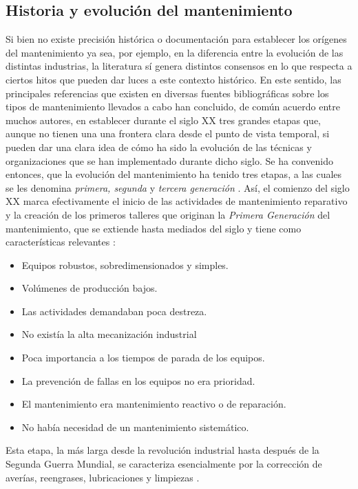 \subsection{Historia y evolución del mantenimiento}

Si bien no existe precisión histórica o documentación para establecer los orígenes del mantenimiento ya sea, por ejemplo, en la diferencia entre la evolución de las distintas industrias, la literatura sí genera distintos consensos en lo que respecta a ciertos hitos que pueden dar luces a este contexto histórico. En este sentido, las principales referencias que existen en diversas fuentes bibliográficas sobre los tipos de mantenimiento llevados a cabo han concluido, de común acuerdo entre muchos autores, en establecer durante el siglo XX tres grandes etapas que, aunque no tienen una una frontera clara desde el punto de vista temporal, si pueden dar una clara idea de cómo ha sido la evolución de las técnicas y organizaciones que se han implementado durante dicho siglo. Se ha convenido entonces, que la evolución del mantenimiento ha tenido tres etapas, a las cuales se les denomina \textit{primera, segunda} y \textit{tercera generación} \citep{gonzalez2005}.
Así, el comienzo del siglo XX marca efectivamente el inicio de las actividades de mantenimiento reparativo y la creación de los primeros talleres que originan la \textit{Primera Generación} del mantenimiento, que se extiende hasta mediados del siglo y tiene como características relevantes \citep{garcia2012}:

\begin{itemize}
\item Equipos robustos, sobredimensionados y simples.
\item Volúmenes de producción bajos.
\item Las actividades demandaban poca destreza.
\item No existía la alta mecanización industrial
\item Poca importancia a los tiempos de parada de los equipos.
\item La prevención de fallas en los equipos no era prioridad.
\item El mantenimiento era mantenimiento reactivo o de reparación.
\item No había necesidad de un mantenimiento sistemático.
\end{itemize}  

Esta etapa, la más larga desde la revolución industrial hasta después de la Segunda Guerra Mundial, se caracteriza esencialmente por la corrección de averías, reengrases, lubricaciones y limpiezas \citep{gonzalez2005}.

